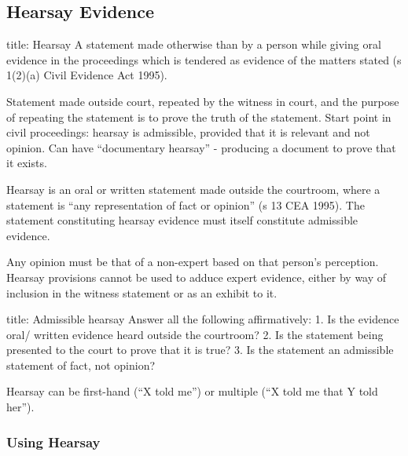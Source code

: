 \documentclass[
]{article}
\newenvironment{Shaded}{}{}
\newcommand{\NormalTok}[1]{#1}
\begin{document}
\hypertarget{hearsay-evidence}{%
\subsection{Hearsay Evidence}\label{hearsay-evidence}}

\begin{Shaded}
\begin{Highlighting}[]
\NormalTok{title: Hearsay}
\NormalTok{A statement made otherwise than by a person while giving oral evidence in the proceedings which is tendered as evidence of the matters stated (s 1(2)(a) Civil Evidence Act 1995). }
\end{Highlighting}
\end{Shaded}

Statement made outside court, repeated by the witness in court, and the
purpose of repeating the statement is to prove the truth of the
statement. Start point in civil proceedings: hearsay is admissible,
provided that it is relevant and not opinion. Can have ``documentary
hearsay'' - producing a document to prove that it exists.

Hearsay is an oral or written statement made outside the courtroom,
where a statement is ``any representation of fact or opinion'' (s 13 CEA
1995). The statement constituting hearsay evidence must itself
constitute admissible evidence.

Any opinion must be that of a non-expert based on that person's
perception. Hearsay provisions cannot be used to adduce expert evidence,
either by way of inclusion in the witness statement or as an exhibit to
it.

\begin{Shaded}
\begin{Highlighting}[]
\NormalTok{title: Admissible hearsay}
\NormalTok{Answer all the following affirmatively: }
\NormalTok{1. Is the evidence oral/ written evidence heard outside the courtroom?}
\NormalTok{2. Is the statement being presented to the court to prove that it is true?}
\NormalTok{3. Is the statement an admissible statement of fact, not opinion?}
\end{Highlighting}
\end{Shaded}

Hearsay can be first-hand (``X told me'') or multiple (``X told me that
Y told her'').

\hypertarget{using-hearsay}{%
\subsubsection{Using Hearsay}\label{using-hearsay}}
\end{document}
